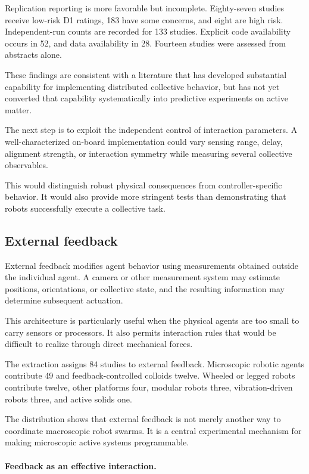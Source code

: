 Replication reporting is
more favorable but incomplete.
Eighty-seven studies receive
low-risk D1 ratings,
183 have some concerns,
and eight are high risk.
Independent-run counts
are recorded for 133 studies.
Explicit code availability
occurs in 52, and data
availability in 28.
Fourteen studies were
assessed from abstracts alone.

These findings are consistent
with a literature that has
developed substantial capability
for implementing distributed
collective behavior, but
has not yet converted
that capability systematically
into predictive experiments
on active matter.

The next step is to exploit
the independent control
of interaction parameters.
A well-characterized
on-board implementation
could vary sensing range,
delay, alignment strength,
or interaction symmetry
while measuring several
collective observables.

This would distinguish
robust physical consequences
from controller-specific
behavior. It would also
provide more stringent
tests than demonstrating
that robots successfully
execute a collective task.

\subsection{External feedback}
\label{sec:control-external}

External feedback modifies agent behavior using
measurements obtained outside the individual agent.
A camera or other measurement system may estimate
positions, orientations, or collective state, and
the resulting information may determine subsequent
actuation.

This architecture is particularly useful when
the physical agents are too small to carry
sensors or processors. It also permits
interaction rules that would be difficult
to realize through direct mechanical forces.

The extraction assigns 84 studies to external
feedback. Microscopic robotic agents contribute
49 and feedback-controlled colloids twelve.
Wheeled or legged robots contribute twelve,
other platforms four, modular robots three,
vibration-driven robots three,
and active solids one.

The distribution shows that external feedback
is not merely another way to coordinate
macroscopic robot swarms. It is a central
experimental mechanism for making microscopic
active systems programmable.

\paragraph*{Feedback as an effective interaction.}

